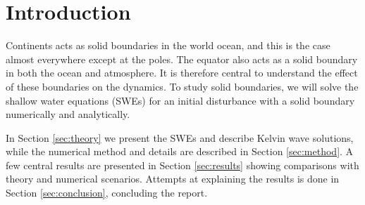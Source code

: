 \section{Introduction}
\label{sec:introduction}
Continents acts as solid boundaries in the world ocean, and this is the case almost everywhere except at the poles. The equator also acts as a solid boundary in both the ocean and atmosphere. It is therefore central to understand the effect of these boundaries on the dynamics. To study solid boundaries, we will solve the shallow water equations (SWEs) for an initial disturbance with a solid boundary numerically and analytically.

In Section \ref{sec:theory} we present the SWEs and describe Kelvin wave solutions, while the numerical method and details are described in Section \ref{sec:method}. A few central results are presented in Section \ref{sec:results} showing comparisons with theory and numerical scenarios. Attempts at explaining the results is done in Section \ref{sec:conclusion}, concluding the report.
